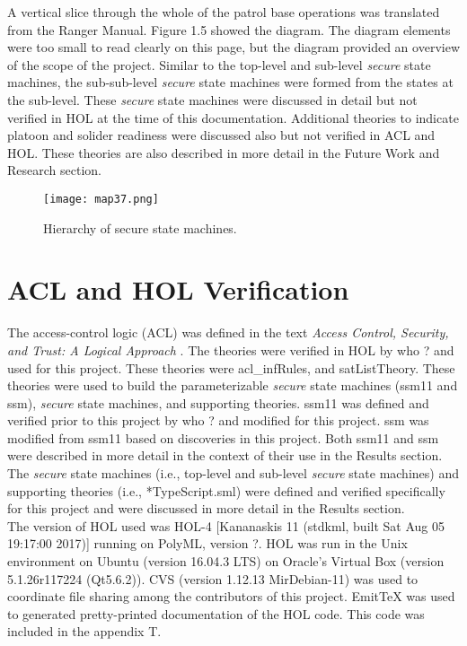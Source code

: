 A vertical slice through the whole of the patrol base operations was translated from the Ranger Manual.
Figure 1.5 showed the diagram.  The diagram elements were too small to read clearly on this page, but
the diagram provided an overview of the scope of the project.  Similar to the top-level and sub-level
\emph{secure} state machines, the sub-sub-level \emph{secure} state machines were formed from the states
at the sub-level.  These \emph{secure} state machines were discussed in detail but not verified in HOL
at the time of this documentation.  Additional theories to indicate platoon and solider readiness were
discussed also but not verified in ACL and HOL. These theories are also described in more detail in the
Future Work and Research section.

\begin{figure}[h]
  \centering
  \texttt{[image: map37.png]}
  \caption{Hierarchy of secure state machines.}
\end{figure}


\section{ACL and HOL Verification}
\label{sec:acl-hol-verification}

The access-control logic (ACL) was defined in the text \emph{Access Control, Security, and Trust:
  A Logical Approach} \cite{acst}.  The theories were verified in HOL by who ? and used for this project.
These theories were acl_infRules, and satListTheory.   These theories were used to build the
parameterizable \emph{secure} state machines (ssm11 and ssm), \emph{secure} state machines, and
supporting theories.  ssm11 was defined and verified prior to this project by who ?  and modified
for this project.   ssm was modified from ssm11 based on discoveries in this project.  Both ssm11
and ssm were described in more detail in the context of their use in the Results section.   The
\emph{secure} state machines (i.e., top-level and sub-level \emph{secure} state machines) and
supporting theories (i.e., *TypeScript.sml) were defined and verified specifically for this project
and were discussed in more detail in the Results section.  \\

The version of HOL used was HOL-4 [Kananaskis 11  (stdkml, built Sat Aug 05 19:17:00 2017)]
running on  PolyML, version ?.  HOL was run in the Unix environment on Ubuntu (version 16.04.3 LTS)
on Oracle's Virtual Box (version 5.1.26r117224 (Qt5.6.2)).  CVS (version 1.12.13 MirDebian-11) was
used to coordinate file sharing among the contributors of this project. EmitTeX was used to generated
pretty-printed documentation of the HOL code.  This code was included in the appendix T. \\

